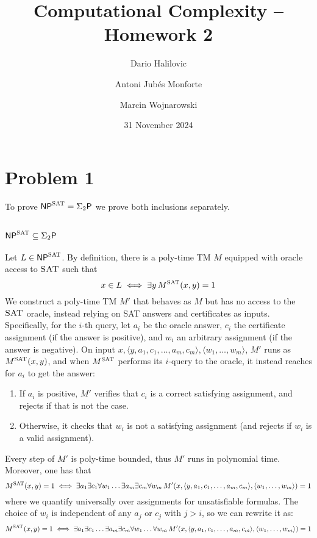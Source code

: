 \documentclass{article}
\title{Computational Complexity -- Homework 2}
\author{Dario Halilovic\and
Antoni Jubés Monforte\and
Marcin Wojnarowski}
\date{31 November 2024}
\renewcommand{\P}[0]{\mathsf{P}}
\newcommand{\NP}[0]{\mathsf{NP}}
\newcommand{\SAT}[0]{\textsc{SAT}}
\begin{document}
\maketitle

\section*{Problem 1}

To prove $\NP^\SAT = \Sigma_2\P$ we prove both inclusions separately.

\subsection{$\NP^\SAT \subseteq \Sigma_2\P$}

Let $L \in \NP^\SAT$. By definition, there is a poly-time TM $M$ equipped with oracle access to $\SAT$ such that
\[
	x \in L \iff \exists y \, M^\SAT(x, y) = 1
\]
We construct a poly-time TM $M'$ that behaves as $M$ but has no access to the $\SAT$ oracle, instead relying on SAT answers and certificates as inputs. Specifically, for the $i$-th query, let $a_i$ be the oracle answer, $c_i$ the certificate assignment (if the answer is positive), and $w_i$ an arbitrary assignment (if the answer is negative). On input $x, \langle y, a_1, c_1, \ldots, a_m, c_m \rangle, \langle w_1, \ldots, w_m \rangle$, $M'$ runs as $M^{\SAT}(x, y)$, and when $M^{\SAT}$ performs its $i$-query to the oracle, it instead reaches for $a_i$ to get the answer:
\begin{enumerate}
	\item If $a_i$ is positive, $M'$ verifies that $c_i$ is a correct satisfying assignment, and rejects if that is not the case.
	\item Otherwise, it checks that $w_i$ is not a satisfying assignment (and rejects if $w_i$ is a valid assignment).
\end{enumerate}
Every step of $M'$ is poly-time bounded, thus $M'$ runs in polynomial time. Moreover, one has that
\[
	M^{\SAT}(x, y) = 1 \iff \exists a_1 \exists c_1 \forall w_1 \ldots \exists a_m \exists c_m \forall w_m \, M'(x, \langle y, a_1, c_1, \ldots, a_m, c_m \rangle, \langle w_1, \ldots, w_m \rangle) = 1
\]
where we quantify universally over assignments for unsatisfiable formulas. The choice of $w_i$ is independent of any $a_j$ or $c_j$ with $j>i$, so we can rewrite it as:
\[
	M^{\SAT}(x, y) = 1 \iff \exists a_1 \exists c_1 \ldots \exists a_m \exists c_m \forall w_1 \ldots \forall w_m \, M'(x, \langle y, a_1, c_1, \ldots, a_m, c_m \rangle, \langle w_1, \ldots, w_m \rangle) = 1
\]
\end{document}
